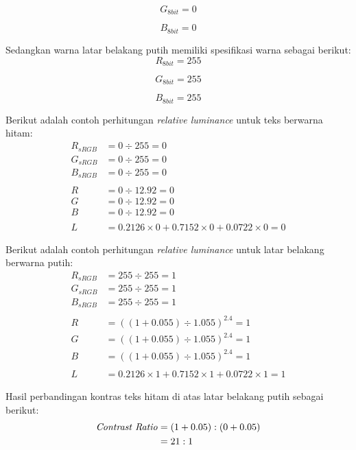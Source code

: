 \begin{equation}
G_{8bit} = 0
\end{equation}

\begin{equation}
B_{8bit} = 0
\end{equation}

Sedangkan warna latar belakang putih memiliki spesifikasi warna sebagai berikut:
\begin{equation}
R_{8bit} = 255
\end{equation}

\begin{equation}
G_{8bit} = 255
\end{equation}

\begin{equation}
B_{8bit} = 255
\end{equation}

Berikut adalah contoh perhitungan \textit{relative luminance} untuk teks berwarna hitam:
\begin{align*}
R_{sRGB} &= 0 \div 255 = 0 \\
G_{sRGB} &= 0 \div 255 = 0 \\
B_{sRGB} &= 0 \div 255 = 0 \\
\\
R &= 0 \div 12.92 = 0 \\
G &= 0 \div 12.92 = 0 \\
B &= 0 \div 12.92 = 0 \\
\\
L &= 0.2126 \times 0 + 0.7152 \times 0 + 0.0722 \times 0 = 0
\end{align*}

Berikut adalah contoh perhitungan \textit{relative luminance} untuk latar belakang berwarna putih:
\begin{align*}
R_{sRGB} &= 255 \div 255 = 1 \\
G_{sRGB} &= 255 \div 255 = 1 \\
B_{sRGB} &= 255 \div 255 = 1 \\
\\
R &= ((1 + 0.055)\div 1.055)^{2.4} = 1 \\
G &= ((1 + 0.055)\div 1.055)^{2.4} = 1 \\
B &= ((1 + 0.055)\div 1.055)^{2.4} = 1 \\
\\
L &= 0.2126 \times 1 + 0.7152 \times 1 + 0.0722 \times 1 = 1
\end{align*}

Hasil perbandingan kontras teks hitam di atas latar belakang putih sebagai berikut:
\begin{align*}
\text{\textit{Contrast Ratio}} &= (1 + 0.05) : (0 + 0.05) \\
&= 21 : 1
\end{align*}

